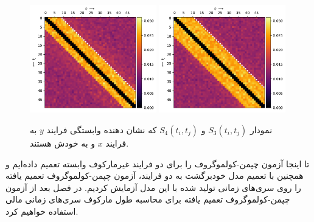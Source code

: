 \begin{figure}[H]
    \centering
    {\includegraphics[width=0.49\textwidth]{images/CCKtestyx.pdf}}
    {\includegraphics[width=0.49\textwidth]{images/CCKtestyy.pdf}}
    \caption{نمودار $S_{3}( t_i, t_j )$ و $S_{4}( t_i, t_j )$ که نشان دهنده وابستگی فرایند $y$ به فرایند $x$ و به خودش هستند.}\label{fig:CCKtesty}
\end{figure}
تا اینجا آزمون چپمن-کولموگروف را برای دو فرایند غیرمارکوف وابسته تعمیم داده‌ایم و همچنین با تعمیم مدل خودبرگشت به 
دو فرایند، آزمون چپمن-کولموگروف تعمیم یافته را روی سری‌های زمانی تولید شده با این مدل آزمایش کردیم. در فصل بعد 
از آزمون چپمن-کولموگروف تعمیم یافته برای محاسبه طول مارکوف سری‌های زمانی مالی استفاده خواهیم کرد.
